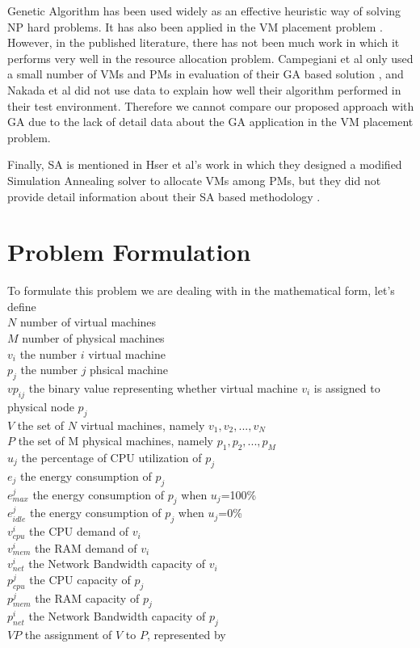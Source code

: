 \documentclass[10pt, conference, compsocconf]{IEEEtran}
\begin{document}
Genetic Algorithm has been used widely as an effective heuristic way of solving
NP hard problems. It has also been applied in the VM placement problem
\cite{nakada09}\cite{campegiani09}.
However, in the published literature, there has not been much work in which it
performs very well in the resource allocation problem. Campegiani et
al\cite{campegiani09} only used a small number of VMs and PMs in evaluation of their GA based solution ,
and Nakada et al\cite{nakada09} did not use data to explain how well their
algorithm performed in their test environment. Therefore we cannot compare our proposed approach
with GA due to the lack of detail data about the GA application in the VM
placement problem.

Finally, SA is mentioned in Hser et al's work\cite{hyser07} in which they designed a modified
Simulation Annealing solver to allocate VMs among PMs, but they did not provide
detail information about their SA based methodology .

\section{Problem Formulation}
To formulate this problem we are dealing with in the mathematical form, let's
define\\
$N$ number of virtual machines\\
$M$	number of physical machines\\
$v_i$	the number $i$ virtual machine\\
$p_j$	the number $j$ phsical machine\\
$vp_{ij}$	the binary value representing whether virtual machine $v_i$ is
assigned to physical node $p_j$\\
$V$	the set of $N$ virtual machines, namely ${v_1,v_2,...,v_N}$\\
$P$	the set of M physical machines, namely ${p_1,p_2,...,p_M}$\\
$u_j$	the percentage of CPU utilization of $p_j$\\
$e_j$	the energy consumption of $p_j$\\
$e_{max}^j$	the energy consumption of $p_j$ when $u_j$=100\%\\
$e_{idle}^j$	the energy consumption of $p_j$ when $u_j$=0\%\\
$v_{cpu}^i$	the CPU demand of $v_i$\\
$v_{mem}^i$ the RAM demand of $v_i$\\
$v_{net}^i$	the Network Bandwidth capacity of $v_i$\\
$p_{cpu}^j$	 the CPU capacity of  $p_j$\\
$p_{mem}^j$ the RAM capacity of  $p_j$\\
$p_{net}^i$	the Network Bandwidth capacity of $p_j$\\
$VP$	the assignment of $V$ to $P$, represented by
\end{document}
